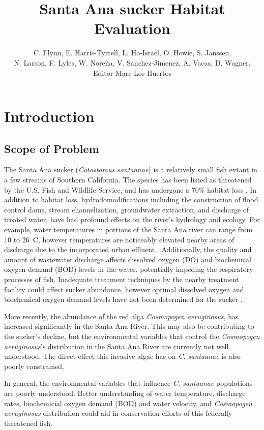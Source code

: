 \documentclass{article}\usepackage[]{graphicx}\usepackage[]{color}
\title{Santa Ana sucker Habitat Evaluation}
\author{C. Flynn, E. Harris-Tyrrell, L. Ho-Israel, O. Howie, S. Janssen, \\N. Larson, F. Lyles, W. Nore\~na, V. Sanchez-Jimenez, A. Vacas, D. Wagner, Editor Marc Los Huertos}
\affil{Environmental Analysis 30, Fall 2016, Pomona College}
\begin{document}
\maketitle

\newpage
\tableofcontents
\newpage

\section{Introduction}

\subsection{Scope of Problem}

The Santa Ana sucker (\emph{Catostomus santaanae}) is a relatively small fish extant in a few streams of Southern California. The species has been listed as threatened by the U.S. Fish and Wildlife Service, and has undergone a 70\% habitat loss \citep{obrien2011status, usfishandwildlifeservice14}. In addition to habitat loss, hydrodomodifications including the construction of flood control dams, stream channelization, groundwater extraction, and discharge of treated water, have had profound effects on the river's hydrology and ecology. For example, water temperatures in portions of the Santa Ana river can range from 10 to 26\textdegree~C, however temperatures are noticeably elevated nearby areas of discharge due to the incorporated urban effluent \citep{greenfield70}. Additionally, the quality and amount of wastewater discharge affects dissolved oxygen (DO) and biochemical oxygen demand (BOD) levels in the water, potentially impeding the respiratory processes of fish. Inadequate treatment techniques by the nearby treatment facility could affect sucker abundance, however optimal dissolved oxygen and biochemical oxygen demand levels have not been determined for the sucker \citep{baskerville2012recovery}. 

More recently, the abundance of the red alga \emph{Cosmopogen aeruginosus}, has increased significantly in the Santa Ana River. This may also be contributing to the sucker's decline, but the environmental variables that control the \emph{Cosmopogen aeruginosus}'s distribution in the Santa Ana River are currently not well understood. The direct effect this invasive algae has on \emph{C. santaanae} is also poorly constrained. 

In general, the environmental variables that influence \emph{C. santaanae} populations are poorly understood. Better understanding of water temperature, discharge rates, biochemicial oxygen demand (BOD) and water velocity, and \emph{Cosmopogen aeruginosus} distribution could aid in conservation efforts of this federally threatened fish. 
\end{document}
